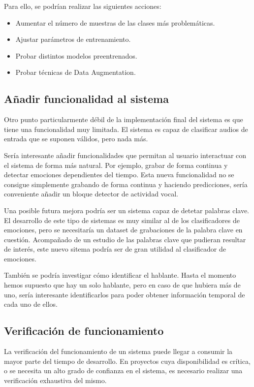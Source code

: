 Para ello, se podrían realizar las siguientes acciones:
\begin{itemize}
    \item Aumentar el número de muestras de las clases más problemáticas.
    \item Ajustar parámetros de entrenamiento.
    \item Probar distintos modelos preentrenados.
    \item Probar técnicas de Data Augmentation.
\end{itemize}




\subsection{Añadir funcionalidad al sistema}
Otro punto particularmente débil de la implementación final del sistema es que tiene una funcionalidad muy limitada.
El sistema es capaz de clasificar audios de entrada que se suponen válidos, pero nada más.

Sería interesante añadir funcionalidades que permitan al usuario interactuar con el sistema de forma más natural.
Por ejemplo, grabar de forma continua y detectar emociones dependientes del tiempo.
Esta nueva funcionalidad no se consigue simplemente grabando de forma continua y haciendo predicciones, sería conveniente añadir un bloque detector de actividad vocal.

Una posible futura mejora podría ser un sistema capaz de detetar palabras clave. 
El desarrollo de este tipo de sistemas es muy similar al de los clasificadores de emociones, pero se necesitaría un dataset de grabaciones de la palabra clave en cuestión.
Acompañado de un estudio de las palabras clave que pudieran resultar de interés, este nuevo sitema podría ser de gran utilidad al clasificador de emociones.

También se podría investigar cómo identificar el hablante.
Hasta el momento hemos supuesto que hay un solo hablante, pero en caso de que hubiera más de uno, sería interesante identificarlos para poder obtener información temporal de cada uno de ellos.


\subsection{Verificación de funcionamiento}
La verificación del funcionamiento de un sistema puede llegar a consumir la mayor parte del tiempo de desarrollo.
En proyectos cuya disponibilidad es crítica, o se necesita un alto grado de confianza en el sistema, es necesario realizar una verificación exhaustiva del mismo.


